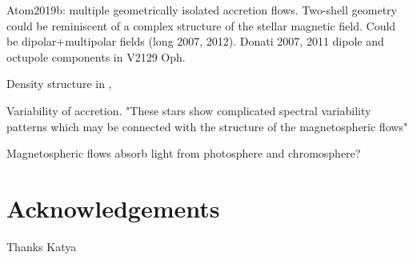 \documentclass[twocolumn,linenumbers]{aastex631}
\begin{document}
Atom2019b: multiple geometrically isolated accretion flows. Two-shell geometry could be reminiscent of a complex structure of the stellar magnetic field. Could be dipolar+multipolar fields (long 2007, 2012). Donati 2007, 2011 dipole and octupole components in V2129 Oph.

Density structure in \citet{zhaohuan2024}, \citet{espaillat2021}

Variability of accretion. "These stars show complicated spectral variability patterns which may be connected with the structure of the magnetospheric flows" \citep{romanova2003}

Magnetospheric flows absorb light from photosphere and chromosphere? \citep{atom2023}

\section*{Acknowledgements}

Thanks Katya


{}

\end{document}
